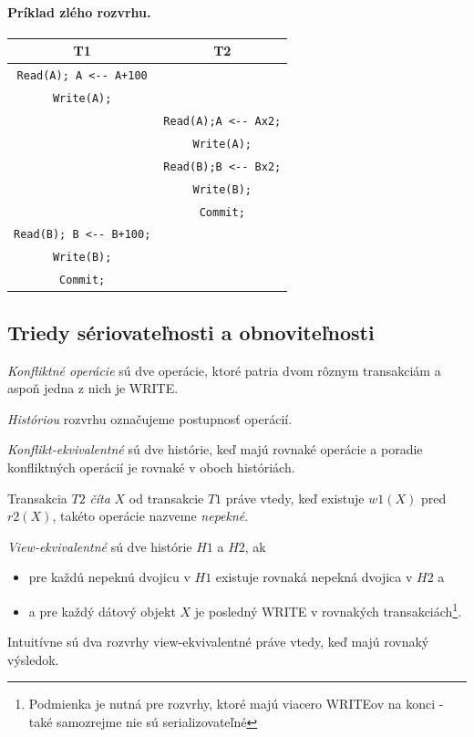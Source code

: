 \documentclass[10pt,a4paper]{article}
\begin{document}
\paragraph{Príklad zlého rozvrhu.}
\begin{center}
\begin{tabular}{c|c}
T1 & T2 \\
\hline
\verb|Read(A); A <-- A+100| & \\
\verb|Write(A);| & \\
& \verb|Read(A);A <-- Ax2;| \\
& \verb|Write(A);| \\
& \verb|Read(B);B <-- Bx2;| \\
& \verb|Write(B);| \\
& \verb|Commit;| \\
\verb|Read(B); B <-- B+100;| & \\
\verb|Write(B);| & \\
\verb|Commit;| & \\
\end{tabular}
\end{center}

\subsection{Triedy sériovateľnosti a obnoviteľnosti}

\emph{Konfliktné operácie} sú dve operácie, ktoré patria dvom rôznym transakciám a aspoň jedna z nich je WRITE.

\emph{Históriou} rozvrhu označujeme postupnosť operácií.

\emph{Konflikt-ekvivalentné} sú dve histórie, keď majú rovnaké operácie a poradie konfliktných operácií je rovnaké v oboch históriách.

Transakcia $T2$ \emph{číta} $X$ od transakcie $T1$ práve vtedy, keď existuje $w1(X)$ pred $r2(X)$,
takéto operácie nazveme \emph{nepekné}.

\emph{View-ekvivalentné} sú dve histórie $H1$ a $H2$, ak
\begin{itemize}
\item pre každú nepeknú dvojicu v $H1$ existuje rovnaká nepekná dvojica v $H2$ a
\item a pre každý dátový objekt $X$ je posledný WRITE v rovnakých transakciách\footnote{Podmienka je nutná pre rozvrhy, ktoré majú viacero WRITEov na konci - také samozrejme nie sú serializovateľné}.
\end{itemize}
Intuitívne sú dva rozvrhy view-ekvivalentné práve vtedy, keď majú rovnaký výsledok.
\end{document}
